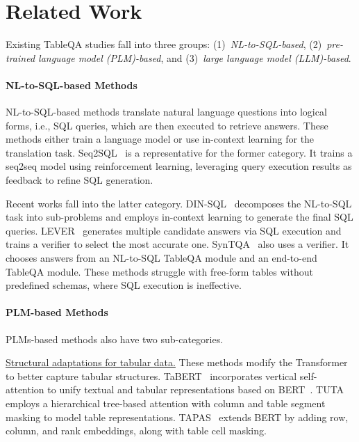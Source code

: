 \section{Related Work}
Existing TableQA studies fall into three groups: 
(1)~\emph{NL-to-SQL-based}, (2)~\emph{pre-trained language model (PLM)-based}, and (3)~\emph{large language model (LLM)-based}.


\paragraph{NL-to-SQL-based Methods} NL-to-SQL-based methods translate natural language questions into logical forms, i.e., SQL queries, which are then executed to retrieve answers. These methods either train a language model or use in-context learning for the translation task. Seq2SQL~\cite{zhong2017seq2sql} is a representative for the former category. It trains a seq2seq model using reinforcement learning, leveraging query execution results as feedback to refine SQL generation. 

Recent works fall into the latter category. DIN-SQL~\cite{pourreza2023dinsqldecomposedincontextlearning} decomposes the NL-to-SQL task into sub-problems and employs in-context learning to generate the final SQL queries. LEVER~\cite{ni2023lever} generates multiple candidate answers via SQL execution and trains a verifier to select the most accurate one. SynTQA~\cite{ZhangLZ24} also uses a verifier. It chooses answers from an NL-to-SQL TableQA module and an end-to-end TableQA module. These methods 
struggle with free-form tables without predefined schemas, where SQL execution is ineffective.


\paragraph{PLM-based Methods} PLMs-based methods also have two sub-categories.

\underline{Structural adaptations for tabular data.} These methods modify the Transformer~\cite{vaswani2017attention} to better capture tabular structures. TaBERT~\cite{yin-etal-2020-tabert} incorporates vertical self-attention to unify textual and tabular representations based on BERT~\cite{devlin-etal-2019-bert}. TUTA~\cite{wang2021tuta} employs a hierarchical tree-based attention with column and table segment masking to model table representations. TAPAS~\cite{herzig-etal-2020-tapas} extends BERT by adding row, column, and rank embeddings, along with table cell masking.

